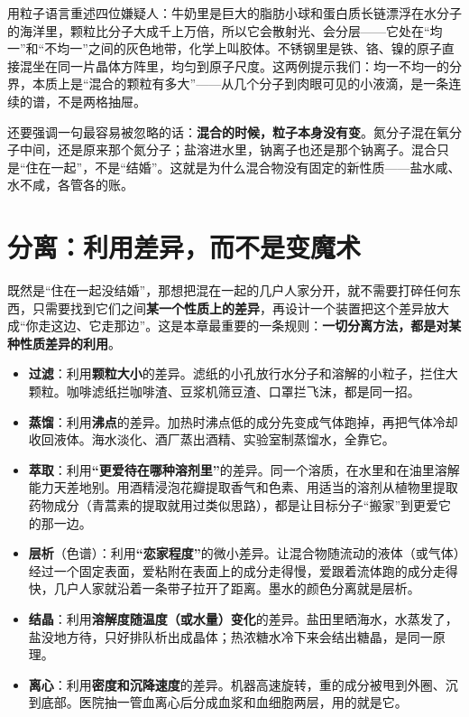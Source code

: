 用粒子语言重述四位嫌疑人：牛奶里是巨大的脂肪小球和蛋白质长链漂浮在水分子的海洋里，颗粒比分子大成千上万倍，所以它会散射光、会分层——它处在“均一”和“不均一”之间的灰色地带，化学上叫胶体。不锈钢里是铁、铬、镍的原子直接混坐在同一片晶体方阵里，均匀到原子尺度。这两例提示我们：均一不均一的分界，本质上是“混合的颗粒有多大”——从几个分子到肉眼可见的小液滴，是一条连续的谱，不是两格抽屉。

还要强调一句最容易被忽略的话：\textbf{混合的时候，粒子本身没有变}。氮分子混在氧分子中间，还是原来那个氮分子；盐溶进水里，钠离子也还是那个钠离子。混合只是“住在一起”，不是“结婚”。这就是为什么混合物没有固定的新性质——盐水咸、水不咸，各管各的账。

\section{分离：利用差异，而不是变魔术}

既然是“住在一起没结婚”，那想把混在一起的几户人家分开，就不需要打碎任何东西，只需要找到它们之间\textbf{某一个性质上的差异}，再设计一个装置把这个差异放大成“你走这边、它走那边”。这是本章最重要的一条规则：\textbf{一切分离方法，都是对某种性质差异的利用}。

\begin{itemize}[itemsep=2pt]
\item \textbf{过滤}：利用\textbf{颗粒大小}的差异。滤纸的小孔放行水分子和溶解的小粒子，拦住大颗粒。咖啡滤纸拦咖啡渣、豆浆机筛豆渣、口罩拦飞沫，都是同一招。
\item \textbf{蒸馏}：利用\textbf{沸点}的差异。加热时沸点低的成分先变成气体跑掉，再把气体冷却收回液体。海水淡化、酒厂蒸出酒精、实验室制蒸馏水，全靠它。
\item \textbf{萃取}：利用\textbf{“更爱待在哪种溶剂里”}的差异。同一个溶质，在水里和在油里溶解能力天差地别。用酒精浸泡花瓣提取香气和色素、用适当的溶剂从植物里提取药物成分（青蒿素的提取就用过类似思路），都是让目标分子“搬家”到更爱它的那一边。
\item \textbf{层析}（色谱）：利用\textbf{“恋家程度”}的微小差异。让混合物随流动的液体（或气体）经过一个固定表面，爱粘附在表面上的成分走得慢，爱跟着流体跑的成分走得快，几户人家就沿着一条带子拉开了距离。墨水的颜色分离就是层析。
\item \textbf{结晶}：利用\textbf{溶解度随温度（或水量）变化}的差异。盐田里晒海水，水蒸发了，盐没地方待，只好排队析出成晶体；热浓糖水冷下来会结出糖晶，是同一原理。
\item \textbf{离心}：利用\textbf{密度和沉降速度}的差异。机器高速旋转，重的成分被甩到外圈、沉到底部。医院抽一管血离心后分成血浆和血细胞两层，用的就是它。
\end{itemize}

